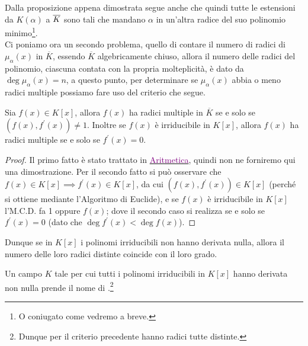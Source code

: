 \documentclass[11pt]{scrartcl}
\begin{document}
Dalla proposizione appena dimostrata segue anche che quindi tutte le estensioni da $K(\alpha)$ a $\overline K$ sono tali che mandano $\alpha$ in un'altra radice del suo polinomio minimo\footnote{O coniugato come vedremo a breve.}.\\
Ci poniamo ora un secondo problema, quello di contare il numero di radici di $\mu_\alpha (x)$ in $\overline K$, essendo $\overline K$ algebricamente chiuso, allora il numero delle radici del polinomio, ciascuna contata 
con la propria molteplicità, è dato da $\deg \mu_\alpha(x) = n$, a questo punto, per determinare se $\mu_\alpha(x)$ abbia o meno radici multiple possiamo fare uso del criterio che segue.

\begin{theorem}
	\label{derivata}
	Sia $f(x) \in K[x]$, allora $f(x)$ ha radici multiple in $\overline K$ se e solo se $(f(x),f^{\prime}(x)) \ne 1$. Inoltre se $f(x)$ è irriducibile in $K[x]$, allora $f(x)$ ha radici multiple se e solo se $f^{\prime}(x) = 0$.
\end{theorem}

\begin{proof}
    Il primo fatto è stato trattato in \href{https://github.com/diego-unipi/Appunti-Aritmetica}{\textcolor{purple}{Aritmetica}}, quindi non ne forniremo qui una dimostrazione. Per il secondo fatto si può osservare che $f(x) \in K[x] \implies f^{\prime}(x) \in K[x]$,
    da cui $(f(x),f^{\prime}(x)) \in K[x]$ (perché si ottiene mediante l'Algoritmo di Euclide), e se $f(x)$ è irriducibile in $K[x]$ l'M.C.D. fa 1 oppure $f(x)$; dove il secondo caso si realizza se e solo se $f^{\prime}(x) = 0$ (dato che $\deg f^{\prime}(x) < \deg f(x)$).
\end{proof}

Dunque se in $K[x]$ i polinomi irriducibili non hanno derivata nulla, allora il numero delle loro radici distinte coincide con il loro grado.

\begin{definition}
    Un campo $K$ tale per cui tutti i polinomi irriducibili in $K[x]$ hanno derivata non nulla prende il nome di .\footnote{Dunque per il criterio precedente hanno radici tutte distinte.}
\end{definition}
\end{document}
